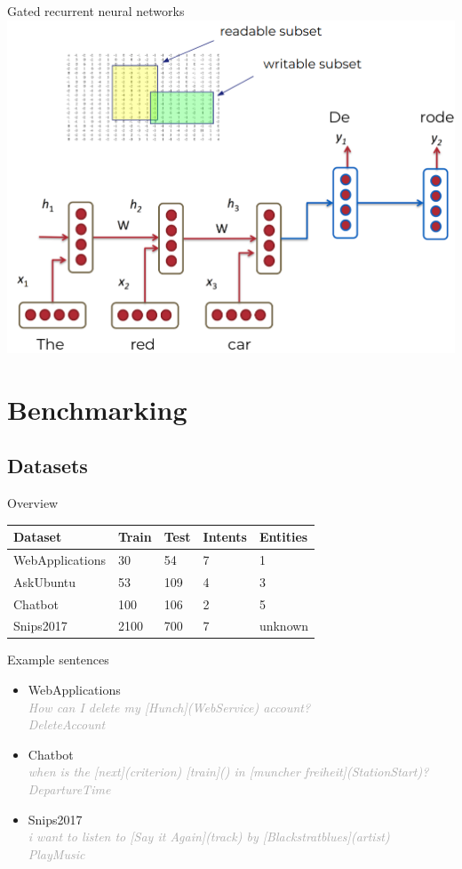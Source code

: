 \documentclass[pdf]{beamer}
\newcommand{\entity}[1]{\textcolor{ao(english)}{#1}}
\newcommand{\intent}[1]{\textcolor{azure(colorwheel)}{#1}}
\newcommand{\demo}[1]{\textit{\textcolor{darkgray}{#1}}}
\begin{document}
    \begin{frame}{Gated recurrent neural networks}
      \includegraphics[height=0.9\textheight]{figures/gru.png}
      \end{frame}
    \section{Benchmarking}
\subsection{Datasets}
\begin{frame}{Overview}
   \begin{tabular}{l l l l l}
        \textbf{Dataset} & \textbf{Train} & \textbf{Test} & \textbf{\intent{Intents}} & \textbf{\entity{Entities}}\\
        \hline
        WebApplications & 30 & 54 & 7 & 1\\
        AskUbuntu & 53 & 109 & 4 & 3\\
        Chatbot & 100 & 106 & 2 & 5\\
        Snips2017 & 2100 & 700 & 7 & unknown\\
    \end{tabular}
  \end{frame}

  \begin{frame}{Example sentences}
    \begin{itemize}
    \item WebApplications\\ 
      \demo{How can I delete my [Hunch](\entity{WebService}) account?} \\
      \demo{\intent{DeleteAccount}}
    \item Chatbot \\
      \demo{when is the [next](\entity{criterion}) [train](\green{vehicle}) in
        [muncher freiheit](\entity{StationStart})?} \\
      \demo{\intent{DepartureTime}}
    \item Snips2017 \\
      \demo{i want to listen to [Say it Again](\entity{track}) by
        [Blackstratblues](\entity{artist})} \\
      \demo{\intent{PlayMusic}}
    \end{itemize}
    \end{frame}
\end{document}

